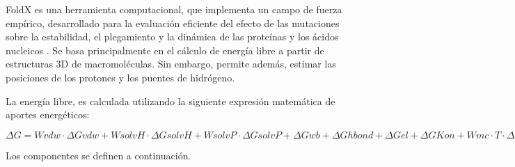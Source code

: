 FoldX es una herramienta computacional, que implementa un campo de fuerza empírico, desarrollado para la evaluación eficiente del efecto de las mutaciones sobre la estabilidad, el plegamiento y la dinámica de las proteínas y los ácidos nucleicos \cite{Schymkowitz2005}. Se basa principalmente en el cálculo de energía libre a partir de estructuras 3D de macromoléculas. Sin embargo, permite además, estimar las posiciones de los protones y los puentes de hidrógeno. 

La energía libre, es calculada utilizando la siguiente expresión matemática de aportes energéticos:


$\Delta G=Wvdw \cdot \Delta Gvdw+WsolvH \cdot \Delta GsolvH+WsolvP \cdot \Delta GsolvP+ \Delta Gwb+ \Delta Ghbond+ \Delta Gel+ \Delta GKon+Wmc \cdot T \cdot \Delta Smc+Wsc \cdot T \cdot \Delta Ssc$

Los componentes se definen a continuación.

